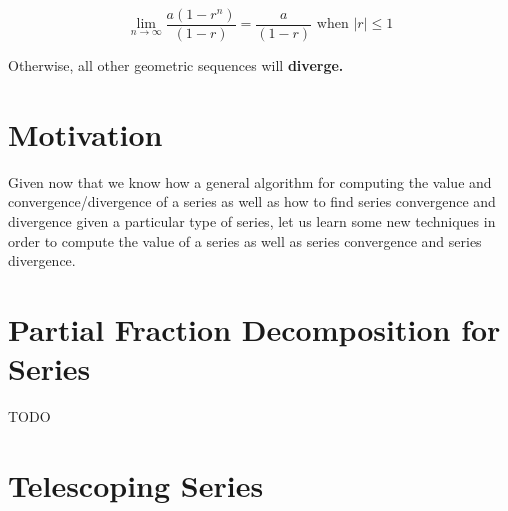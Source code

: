 \documentclass{report}
\begin{document}
\begin{sloppypar}
\[ \lim_{n \rightarrow \infty} \frac{a(1-r^{n})}{(1-r)} = \frac{a}{(1-r)} \textrm{ when $|r| \leq 1 $} \]

Otherwise, all other geometric sequences will \textbf{diverge.}


\section{Motivation}
Given now that we know how a general algorithm for computing the value and convergence/divergence
of a series as well as how to find series convergence and divergence given a particular type
of series, let us learn some new techniques in order to compute the value of a series
as well as series convergence and series divergence.

\section{Partial Fraction Decomposition for Series}
TODO

\section{Telescoping Series}
\begin{center}
\end{center}

\end{sloppypar}
\end{document}
